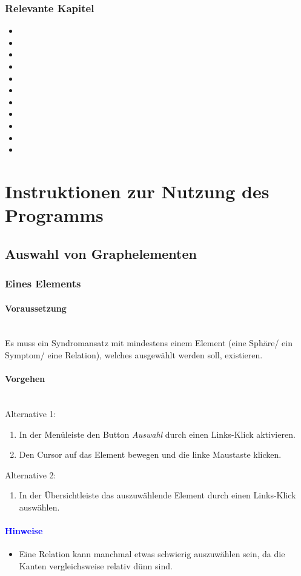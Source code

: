 \documentclass[enabledeprecatedfontcommands,fontsize=11pt,paper=a4,twoside]{scrartcl}
\newcounter{one}
\newcommand*{\hint}{\paragraph{\textcolor{blue}{Hinweise}}}
\newcommand*{\condition}{\paragraph{Voraussetzung}$\;$ \vspace{0.2cm}\\}
\newcommand*{\actions}{\paragraph{Vorgehen} $\;$\vspace{0.2cm}\\}
\begin{document}
\subsubsection{Relevante Kapitel}
\begin{itemize}
	\item {}	
	\item {}
	\item {}
	\item {}
	\item {}
	\item {}
	\item {}
	\item {}
	\item {}
	\item {}	
	\item {}
\end{itemize}


\newpage
\section{Instruktionen zur Nutzung des Programms} \label{sec:nutzung}
		\subsection{Auswahl von Graphelementen} \label{pick}
	\subsubsection{Eines Elements}
	\condition
	Es muss ein Syndromansatz mit mindestens einem Element (eine Sphäre/ ein Symptom/ eine Relation), welches ausgewählt werden soll, existieren. 
	\actions
	Alternative 1: 
	\begin{enumerate}
		\item In der Menüleiste den Button \textit{Auswahl} durch einen Links-Klick aktivieren. 
		\item Den Cursor auf das Element bewegen und die linke Maustaste klicken. 
	\end{enumerate}
	Alternative 2: 
	\begin{enumerate}
		\item In der Übersichtleiste das auszuwählende Element durch einen Links-Klick auswählen. 
	\end{enumerate}
	\hint
	\begin{itemize}
		\item Eine Relation kann manchmal etwas schwierig auszuwählen sein, da die Kanten vergleichsweise relativ dünn sind. 
	\end{itemize}
	
\end{document}
